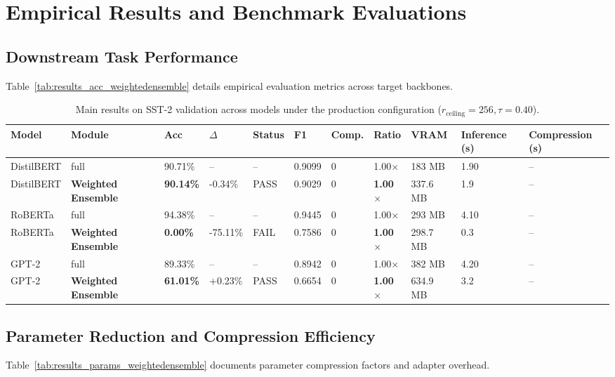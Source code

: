 \section{Empirical Results and Benchmark Evaluations}

\subsection{Downstream Task Performance}
Table~\ref{tab:results_acc_weightedensemble} details empirical evaluation metrics across target backbones.

\begin{table}[t]
\centering
\small
\begin{tabular}{lllllllllll}
\toprule
\textbf{Model} & \textbf{Module} & \textbf{Acc} & \textbf{$\Delta$} & \textbf{Status} & \textbf{F1} & \textbf{Comp.} & \textbf{Ratio} & \textbf{VRAM} & \textbf{Inference (s)} & \textbf{Compression (s)} \\
\midrule
DistilBERT & full & 90.71\% & -- & -- & 0.9099 & 0 & 1.00$\times$ & 183 MB & 1.90 & -- \\
DistilBERT & \textbf{Weighted Ensemble} & \textbf{90.14\%} & -0.34\% & PASS & 0.9029 & 0 & \textbf{1.00$\times$} & 337.6 MB & 1.9 & -- \\
RoBERTa & full & 94.38\% & -- & -- & 0.9445 & 0 & 1.00$\times$ & 293 MB & 4.10 & -- \\
RoBERTa & \textbf{Weighted Ensemble} & \textbf{0.00\%} & -75.11\% & FAIL & 0.7586 & 0 & \textbf{1.00$\times$} & 298.7 MB & 0.3 & -- \\
GPT-2 & full & 89.33\% & -- & -- & 0.8942 & 0 & 1.00$\times$ & 382 MB & 4.20 & -- \\
GPT-2 & \textbf{Weighted Ensemble} & \textbf{61.01\%} & +0.23\% & PASS & 0.6654 & 0 & \textbf{1.00$\times$} & 634.9 MB & 3.2 & -- \\
\bottomrule
\end{tabular}
\caption{Main results on SST-2 validation across models under the production configuration ($r_{\mathrm{ceiling}}=256, \tau=0.40$).}
\label{tab:main_sst2}
\end{table}

\subsection{Parameter Reduction and Compression Efficiency}
Table~\ref{tab:results_params_weightedensemble} documents parameter compression factors and adapter overhead.

